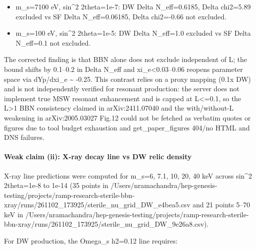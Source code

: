\documentclass[11pt,a4paper]{article}
\begin{document}
\begin{itemize}
  \item m\_s=7100 eV, sin\textasciicircum{}2 2theta=1e-7: DW Delta N\_eff=0.6185, Delta chi2=5.89 excluded vs SF Delta N\_eff=0.06185, Delta chi2=-0.66 not excluded.
  \item m\_s=100 eV, sin\textasciicircum{}2 2theta=1e-5: DW Delta N\_eff=1.0 excluded vs SF Delta N\_eff=0.1 not excluded.
\end{itemize}
The corrected finding is that BBN alone does not exclude independent of L; the bound shifts by 0.1--0.2 in Delta N\_eff and \textbar{}xi\_e\textbar{}\textless{}0.03--0.06 reopens parameter space via dYp/dxi\_e \textasciitilde{} -0.25. This contrast relies on a proxy mapping (0.1x DW) and is not independently verified for resonant production: the server does not implement true MSW resonant enhancement and is capped at L\textless{}=0.1, so the L\textgreater{}1 BBN consistency claimed in arXiv:2411.07040 and the with/without-L weakening in arXiv:2005.03027 Fig.12 could not be fetched as verbatim quotes or figures due to tool budget exhaustion and get\_paper\_figures 404/no HTML and DNS failures.

\paragraph{Weak claim (ii): X-ray decay line vs DW relic density}
X-ray line predictions were computed for m\_s=6, 7.1, 10, 20, 40 keV across sin\textasciicircum{}2 2theta=1e-8 to 1e-14 (35 points in /Users/nramachandra/hep-genesis-testing/projects/ramp-research-sterile-bbn-xray/runs/261102\_173925/sterile\_nu\_grid\_DW\_e4bea5.csv and 21 points 5--70 keV in /Users/nramachandra/hep-genesis-testing/projects/ramp-research-sterile-bbn-xray/runs/261102\_173925/sterile\_nu\_grid\_DW\_9e26a8.csv).

For DW production, the Omega\_s h2=0.12 line requires:
\end{document}
